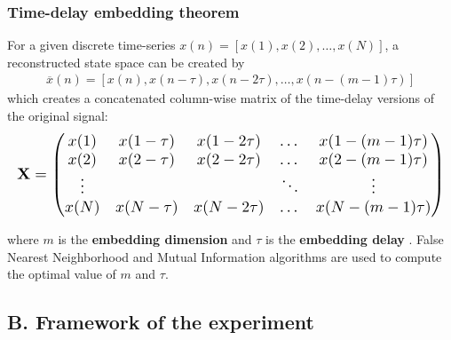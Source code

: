 \documentclass{beamer}
\begin{document}





\begin{frame}
\frametitle{Time-delay embedding theorem}
\vspace{-0.7cm}


For a given discrete time-series $x(n) = [x(1) , x(2), \dots, x(N)]$,
a reconstructed state space can be created by
\begin{eqnarray*}
\overline{x}(n) = [ x(n), x(n - \tau), x(n-2\tau), \dots , x (n-(m-1)\tau) ]
\end{eqnarray*}
which creates a concatenated column-wise matrix of the time-delay versions of the original signal:
\begin{equation}
  \resizebox{\textwidth}{!}{$\displaystyle
  \mathbf{X}
    = \begin{pmatrix} \nonumber
      x(1) & x(1 - \tau) & x(1-2\tau) & \dots & x (1-(m-1)\tau) \\
      x(2) & x(2 - \tau) & x(2-2\tau) & \dots & x (2-(m-1)\tau) \\
      \vdots &  &  & \ddots & \vdots \\
      x(N) & x(N - \tau) & x(N-2\tau) & \dots & x (N-(m-1)\tau) \\
      \end{pmatrix}
     $}
\end{equation}



where $m$ is the \textbf{ embedding dimension}  and  $\tau$ is the \textbf{ embedding delay}
\textcolor{red}{\textbf{  \cite{Takens1981} }}.
False Nearest Neighborhood and Mutual Information algorithms are used to compute
the optimal value of $m$ and $\tau$.

\end{frame}






\subsection{B. Framework of the experiment}
\end{document}
